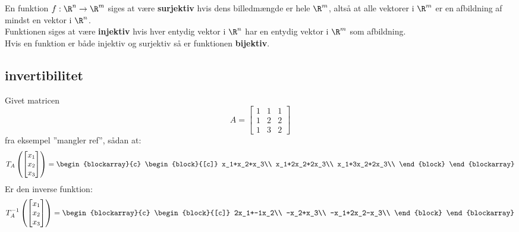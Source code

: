 \\\\


\begin{defn}{}{}
En funktion $f:\R^n \rightarrow \R^m$ siges at være \textbf{surjektiv} hvis dens billedmængde er hele $\R^m$, altså at alle vektorer i $\R^m$ er en afbildning af mindst en vektor i $\R^n$.\\
Funktionen siges at være \textbf{injektiv} hvis hver entydig vektor i $\R^n$ har en entydig vektor i $\R^m$ som afbildning.\\
Hvis en funktion er både injektiv og surjektiv så er funktionen \textbf{bijektiv}.
\end{defn}

\subsection{invertibilitet}

\begin{eks}
Givet matricen 
\begin{equation*}
A=
\begin{bmatrix}
1 & 1 & 1\\
1 & 2 & 2\\
1 & 3 & 2
\end{bmatrix}
\end{equation*}  fra eksempel ''mangler ref'', sådan at:
\begin{equation*}
T_A
\left(
\begin{bmatrix}
x_1\\
x_2\\
x_3
\end{bmatrix}
\right)
=
\begin{blockarray}{c}
\begin{block}{[c]}
x_1+x_2+x_3\\
x_1+2x_2+2x_3\\
x_1+3x_2+2x_3\\
\end{block}
\end{blockarray}
\end{equation*}
Er den inverse funktion:
\begin{equation*}
T_{A}^{-1}\left(
\begin{bmatrix}
x_1\\
x_2\\
x_3
\end{bmatrix}
\right)=
\begin{blockarray}{c}
\begin{block}{[c]}
2x_1+-1x_2\\
-x_2+x_3\\
-x_1+2x_2-x_3\\
\end{block}
\end{blockarray}
\end{equation*}
\end{eks}